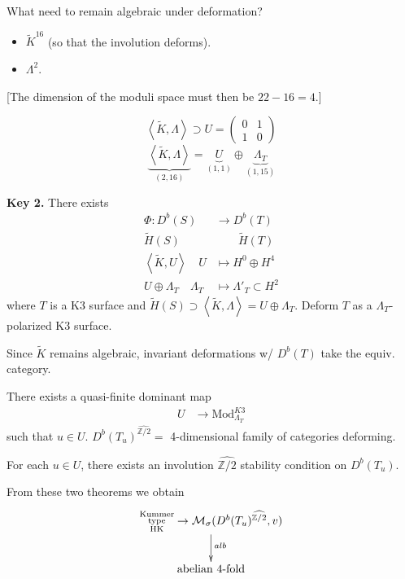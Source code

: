 What need to remain algebraic under
deformation?
\begin{itemize}
\item $\tilde{K}^{16}$ (so that the
involution deforms).
\item $\Lambda^2$.
\end{itemize}
[The dimension of the moduli space must then
be $22-16=4$.]

\begin{lemma}
\label{lemma-}
$$
\left\langle{}\tilde{K},\Lambda\right\rangle{}\supset
U=\begin{pmatrix}
0&1\\
1&0
\end{pmatrix}
$$
$$
\underbrace{\left\langle{}\tilde{K},\Lambda\right\rangle{}}
_{(2,16)}
=\underbrace{U}_{(1,1)
}\oplus\underbrace{\Lambda_T}_{(1,15)}
$$
\end{lemma}

\medskip\noindent
{\bf Key 2.} There exists
$$
\begin{aligned}
\Phi: D^b(S) &\longrightarrow D^b(T) \\
\tilde{H}(S) &\qquad  \tilde{H}(T)\\
\left\langle{}\tilde{K}, U\right\rangle{}\quad U &\longmapsto
H^0 \oplus H^4\\
U \oplus \Lambda_T\quad \Lambda_T
&\longmapsto \Lambda'_T \subset H^2
\end{aligned}
$$
where $ T$ is a K3 surface and $\tilde{H}(S)
\supset \left\langle{}
\tilde{K},\Lambda\right\rangle{}=U\oplus \Lambda_T$.
Deform $T$ as a
$\Lambda_T$-polarized K3 surface.

Since $\tilde{K}$ remains algebraic,
invariant deformations w/ $D^b(T)$ take the
equiv. category.

\begin{theorem}
\label{nasak-label-011}
There exists a quasi-finite dominant map
$$
\begin{aligned}
U  &\longrightarrow
\text{Mod}_{\Lambda_T}^{K3}
\end{aligned}
$$
such that $u \in U$.
$D^b(T_u)^{\widehat{\mathbb{Z}/2}}=$
4-dimensional family of categories deforming.
\end{theorem}

\begin{theorem}
\label{theorem-}
For each $u \in U$, there exists an
involution $\widehat{\mathbb{Z}/2}$ stability
condition on $D^b(T_u)$.
\end{theorem}

From these two theorems we obtain
$$
\xymatrix{
\substack{\text{Kummer} \\\text{type}\\
\text{HK}}\to
\mathcal{M}_{\sigma}(D^b(T_u)
^{\widehat{\mathbb{Z}/2}},v)\ar[d]^{alb}\\
\text{abelian 4-fold}
}
$$

